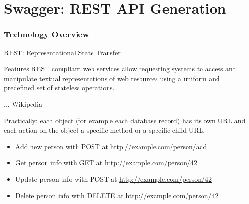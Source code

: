 \part{Swagger: REST API Generation}


\section{Technology Overview}


\begin{frame}{REST: Representational State Transfer}
    \begin{block}{Features}
        REST compliant web services allow requesting systems to access
        and manipulate textual representations of web resources using
        a uniform and predefined set of stateless operations.

        \hfill ... Wikipedia
    \end{block}

    \bigskip

    Practically: each object (for example each database record) has its own URL
    and each action on the object a specific method or a specific child URL.

    \medskip

    \begin{itemize}
        \item Add new person with POST at \url{http://example.com/person/add}
        \item Get person info with GET at \url{http://example.com/person/42}
        \item Update person info with POST at \url{http://example.com/person/42}
        \item Delete person info with DELETE at \url{http://example.com/person/42}
    \end{itemize}

\end{frame}


